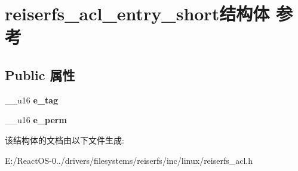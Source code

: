\hypertarget{structreiserfs__acl__entry__short}{}\section{reiserfs\+\_\+acl\+\_\+entry\+\_\+short结构体 参考}
\label{structreiserfs__acl__entry__short}
\subsection*{Public 属性}
\begin{DoxyCompactItemize}
\item 
\mbox{\label{structreiserfs__acl__entry__short_a4f3416beab9e88a0e33cc045c2595bfb}} 
\+\_\+\+\_\+u16 {\bfseries e\+\_\+tag}
\item 
\mbox{\label{structreiserfs__acl__entry__short_a1d1013e61ec18c1777f38e119481381b}} 
\+\_\+\+\_\+u16 {\bfseries e\+\_\+perm}
\end{DoxyCompactItemize}


该结构体的文档由以下文件生成\+:\begin{DoxyCompactItemize}
\item 
E\+:/\+React\+O\+S-\/0../drivers/filesystems/reiserfs/inc/linux/reiserfs\+\_\+acl.\+h\end{DoxyCompactItemize}
